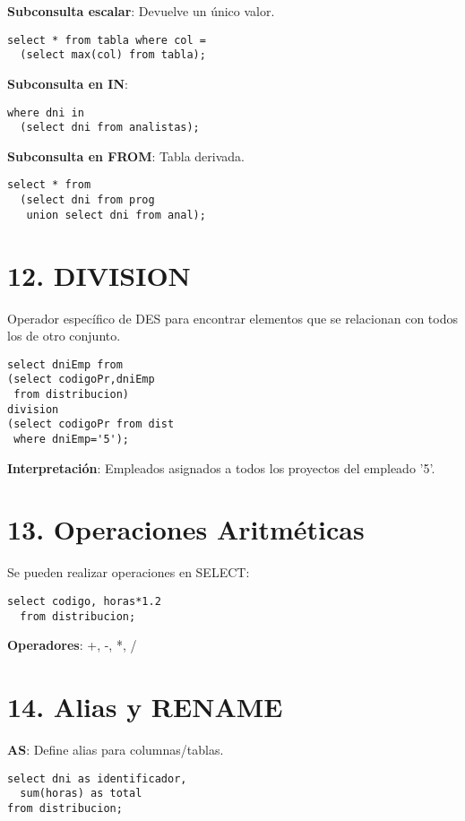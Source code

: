 \documentclass[10pt,a4paper,twocolumn]{article}
\begin{document}
\textbf{Subconsulta escalar}: Devuelve un único valor.
\begin{lstlisting}
select * from tabla where col =
  (select max(col) from tabla);
\end{lstlisting}

\textbf{Subconsulta en IN}:
\begin{lstlisting}
where dni in 
  (select dni from analistas);
\end{lstlisting}

\textbf{Subconsulta en FROM}: Tabla derivada.
\begin{lstlisting}
select * from 
  (select dni from prog 
   union select dni from anal);
\end{lstlisting}

\section*{12. DIVISION}

Operador específico de DES para encontrar elementos que se relacionan con todos los de otro conjunto.

\begin{lstlisting}
select dniEmp from
(select codigoPr,dniEmp 
 from distribucion)
division
(select codigoPr from dist
 where dniEmp='5');
\end{lstlisting}

\textbf{Interpretación}: Empleados asignados a todos los proyectos del empleado '5'.

\section*{13. Operaciones Aritméticas}

Se pueden realizar operaciones en SELECT:
\begin{lstlisting}
select codigo, horas*1.2 
  from distribucion;
\end{lstlisting}

\textbf{Operadores}: +, -, *, /

\section*{14. Alias y RENAME}

\textbf{AS}: Define alias para columnas/tablas.
\begin{lstlisting}
select dni as identificador,
  sum(horas) as total
from distribucion;
\end{lstlisting}
\end{document}

